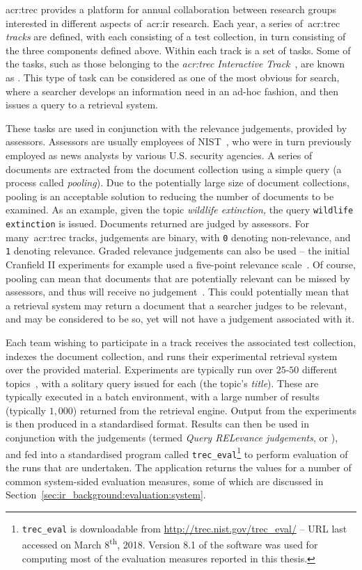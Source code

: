 \gls{acr:trec} provides a platform for annual collaboration between research groups interested in different aspects of~\gls{acr:ir} research. Each year, a series of~\gls{acr:trec} \emph{tracks} are defined, with each consisting of a test collection, in turn consisting of the three components defined above. Within each track is a set of tasks. Some of the tasks, such as those belonging to the \emph{\gls{acr:trec} Interactive Track}~\citep{over2001trec}, are known as . This type of task can be considered as one of the most obvious for search, where a searcher develops an information need in an ad-hoc fashion, and then issues a query to a retrieval system.

These tasks are used in conjunction with the relevance judgements, provided by assessors. Assessors are usually employees of NIST~\citep{robertson2008history_ir_evaluation}, who were in turn previously employed as news analysts by various U.S. security agencies. A series of documents are extracted from the document collection using a simple query (a process called \emph{pooling}). Due to the potentially large size of document collections, pooling is an acceptable solution to reducing the number of documents to be examined. As an example, given the topic \emph{wildlife extinction,} the query \texttt{wildlife extinction} is issued. Documents returned are judged by assessors. For many~\gls{acr:trec} tracks, judgements are binary, with \texttt{0} denoting non-relevance, and \texttt{1} denoting relevance. Graded relevance judgements can also be used -- the initial Cranfield II experiments for example used a five-point relevance scale~\citep{voorhees2001iir_philosophy}. Of course, pooling can mean that documents that are potentially relevant can be missed by assessors, and thus will receive no judgement~\citep{keenan2001effect}. This could potentially mean that a retrieval system may return a document that a searcher judges to be relevant, and may be considered to be so, yet will not have a judgement associated with it.

Each team wishing to participate in a track receives the associated test collection, indexes the document collection, and runs their experimental retrieval system over the provided material. Experiments are typically run over $25$-$50$ different topics~\citep{voorhees2001iir_philosophy}, with a solitary query issued for each (the topic's \emph{title}). These are typically executed in a batch environment, with a large number of results (typically $1,000$) returned from the retrieval engine. Output from the experiments is then produced in a standardised format. Results can then be used in conjunction with the judgements (termed \emph{Query RELevance judgements}, or ), and fed into a standardised program called \texttt{trec\_eval}\footnote{\texttt{trec\_eval} is downloadable from \url{http://trec.nist.gov/trec_eval/} -- URL last accessed on March 8\textsuperscript{th}, 2018. Version 8.1 of the software was used for computing most of the evaluation measures reported in this thesis.} to perform evaluation of the runs that are undertaken. The application returns the values for a number of common system-sided evaluation measures, some of which are discussed in Section~\ref{sec:ir_background:evaluation:system}.

